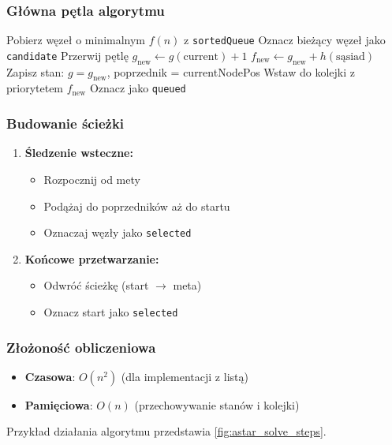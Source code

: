\documentclass[../../../../doc.tex]{subfiles}
\begin{document}
\subsubsection{Główna pętla algorytmu}
\begin{algorithmic}
  \STATE Pobierz węzeł o minimalnym $f(n)$ z \texttt{sortedQueue}
  \STATE Oznacz bieżący węzeł jako \texttt{candidate}
  \STATE Przerwij pętlę
  \ENDIF
  \STATE $g_{\text{new}} \gets g(\text{current}) + 1$
  \STATE $f_{\text{new}} \gets g_{\text{new}} + h(\text{sąsiad})$
  \STATE Zapisz stan: $g = g_{\text{new}}$, poprzednik = currentNodePos
  \STATE Wstaw do kolejki z priorytetem $f_{\text{new}}$
  \STATE Oznacz jako \texttt{queued}
  \ENDIF
  \ENDFOR
  \ENDWHILE
\end{algorithmic}

\subsubsection{Budowanie ścieżki}
\begin{enumerate}
  \item \textbf{Śledzenie wsteczne:}
        \begin{itemize}
          \item Rozpocznij od mety
          \item Podążaj do poprzedników aż do startu
          \item Oznaczaj węzły jako \texttt{selected}
        \end{itemize}
  \item \textbf{Końcowe przetwarzanie:}
        \begin{itemize}
          \item Odwróć ścieżkę (start $\rightarrow$ meta)
          \item Oznacz start jako \texttt{selected}
        \end{itemize}
\end{enumerate}


\subsubsection{Złożoność obliczeniowa}
\begin{itemize}
  \item \textbf{Czasowa}: $O(n^2)$ (dla implementacji z listą)
  \item \textbf{Pamięciowa}: $O(n)$ (przechowywanie stanów i kolejki)
\end{itemize}
Przykład działania algorytmu przedstawia \cref{fig:astar_solve_steps}.

\begin{multicols}{2}
  
\end{multicols}
\end{document}
